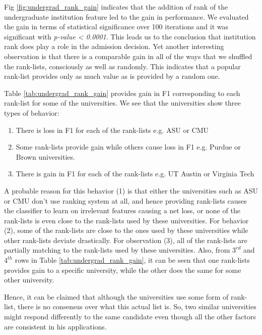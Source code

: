 \documentclass{sig-alternate-05-2015}
\begin{document}
Fig \ref{fig:undergrad_rank_gain} indicates that the addition of rank of the undergraduate institution feature led to the gain in performance. We evaluated the gain in terms of statistical significance over 100 iterations and it was significant with \textit{p-value < 0.0001}. This leads us to the conclusion that institution rank does play a role in the admission decision. Yet another interesting observation is that there is a comparable gain in all of the ways that we shuffled the rank-lists, consciously as well as randomly. This indicates that a popular rank-list provides only as much value as is provided by a random one.

Table \ref{tab:undergrad_rank_gain} provides gain in F1 corresponding to each rank-list for some of the universities. We see that the universities show three types of behavior:
\begin{enumerate}
\item There is loss in F1 for each of the rank-lists e.g. ASU or CMU
\item Some rank-lists provide gain while others cause loss in F1 e.g. Purdue or Brown universities.
\item There is gain in F1 for each of the rank-lists e.g. UT Austin or Virginia Tech
\end{enumerate}

A probable reason for this behavior (1) is that either the universities such as ASU or CMU don't use ranking system at all, and hence providing rank-lists causes the classifier to learn on irrelevant features causing a net loss, or none of the rank-lists is even close to the rank-lists used by these universities. For behavior (2), some of the rank-lists are close to the ones used by these universities while other rank-lists deviate drastically. For observation (3), all of the rank-lists are partially matching to the rank-lists used by these universities. Also, from $3^{rd}$ and $4^{th}$ rows in Table \ref{tab:undergrad_rank_gain}, it can be seen that one rank-lists provides gain to a specific university, while the other does the same for some other university.

Hence, it can be claimed that although the universities use some form of rank-list, there is no consensus over what this actual list is. So, two similar universities might respond differently to the same candidate even though all the other factors are consistent in his applications.
\end{document}
